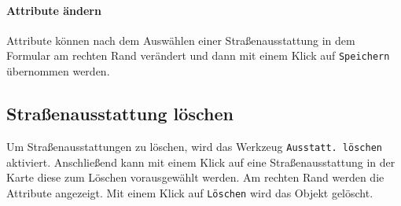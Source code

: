 \documentclass[a4paper,11pt,bibliography=totoc, listof=totoc,titlepage]{scrartcl}
\begin{document}
\paragraph{Attribute ändern}
Attribute können nach dem Auswählen einer Straßenausstattung in dem Formular am rechten Rand verändert und dann mit einem Klick auf \verb|Speichern| übernommen werden.

\subsection{Straßenausstattung löschen}
Um Straßenausstattungen zu löschen, wird das Werkzeug \verb|Ausstatt. löschen| aktiviert. Anschließend kann mit einem Klick auf eine Straßenausstattung in der Karte diese zum Löschen vorausgewählt werden. Am rechten Rand werden die Attribute angezeigt. Mit einem Klick auf \verb|Löschen| wird das Objekt gelöscht.

\clearpage

\printglossaries
\end{document}

